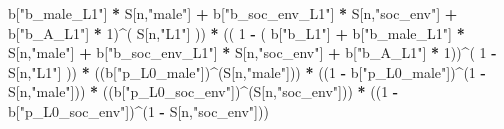 \documentclass[
]{book}
\newenvironment{Shaded}{\begin{snugshade}}{\end{snugshade}}
\newcommand{\DecValTok}[1]{\textcolor[rgb]{0.00,0.00,0.81}{#1}}
\newcommand{\NormalTok}[1]{#1}
\newcommand{\SpecialCharTok}[1]{\textcolor[rgb]{0.81,0.36,0.00}{\textbf{#1}}}
\newcommand{\StringTok}[1]{\textcolor[rgb]{0.31,0.60,0.02}{#1}}
\begin{document}
\begin{Shaded}
\begin{Highlighting}[]
\NormalTok{           b[}\StringTok{"b\_male\_L1"}\NormalTok{] }\SpecialCharTok{*}\NormalTok{ S[n,}\StringTok{"male"}\NormalTok{] }\SpecialCharTok{+}  
\NormalTok{           b[}\StringTok{"b\_soc\_env\_L1"}\NormalTok{] }\SpecialCharTok{*}\NormalTok{ S[n,}\StringTok{"soc\_env"}\NormalTok{] }\SpecialCharTok{+}
\NormalTok{           b[}\StringTok{"b\_A\_L1"}\NormalTok{] }\SpecialCharTok{*} \DecValTok{1}\NormalTok{)}\SpecialCharTok{\^{}}\NormalTok{( S[n,}\StringTok{"L1"}\NormalTok{] )) }\SpecialCharTok{*}
\NormalTok{      (( }\DecValTok{1} \SpecialCharTok{{-}}\NormalTok{ ( b[}\StringTok{"b\_L1"}\NormalTok{] }\SpecialCharTok{+}
\NormalTok{                 b[}\StringTok{"b\_male\_L1"}\NormalTok{] }\SpecialCharTok{*}\NormalTok{ S[n,}\StringTok{"male"}\NormalTok{] }\SpecialCharTok{+}  
\NormalTok{                 b[}\StringTok{"b\_soc\_env\_L1"}\NormalTok{] }\SpecialCharTok{*}\NormalTok{ S[n,}\StringTok{"soc\_env"}\NormalTok{] }\SpecialCharTok{+}
\NormalTok{                 b[}\StringTok{"b\_A\_L1"}\NormalTok{] }\SpecialCharTok{*} \DecValTok{1}\NormalTok{))}\SpecialCharTok{\^{}}\NormalTok{( }\DecValTok{1} \SpecialCharTok{{-}}\NormalTok{ S[n,}\StringTok{"L1"}\NormalTok{] )) }\SpecialCharTok{*}
\NormalTok{      ((b[}\StringTok{"p\_L0\_male"}\NormalTok{])}\SpecialCharTok{\^{}}\NormalTok{(S[n,}\StringTok{"male"}\NormalTok{])) }\SpecialCharTok{*} 
\NormalTok{      ((}\DecValTok{1} \SpecialCharTok{{-}}\NormalTok{ b[}\StringTok{"p\_L0\_male"}\NormalTok{])}\SpecialCharTok{\^{}}\NormalTok{(}\DecValTok{1} \SpecialCharTok{{-}}\NormalTok{ S[n,}\StringTok{"male"}\NormalTok{])) }\SpecialCharTok{*} 
\NormalTok{      ((b[}\StringTok{"p\_L0\_soc\_env"}\NormalTok{])}\SpecialCharTok{\^{}}\NormalTok{(S[n,}\StringTok{"soc\_env"}\NormalTok{])) }\SpecialCharTok{*}
\NormalTok{      ((}\DecValTok{1} \SpecialCharTok{{-}}\NormalTok{ b[}\StringTok{"p\_L0\_soc\_env"}\NormalTok{])}\SpecialCharTok{\^{}}\NormalTok{(}\DecValTok{1} \SpecialCharTok{{-}}\NormalTok{ S[n,}\StringTok{"soc\_env"}\NormalTok{])) }
    

\end{Highlighting}
\end{Shaded}
\end{document}
